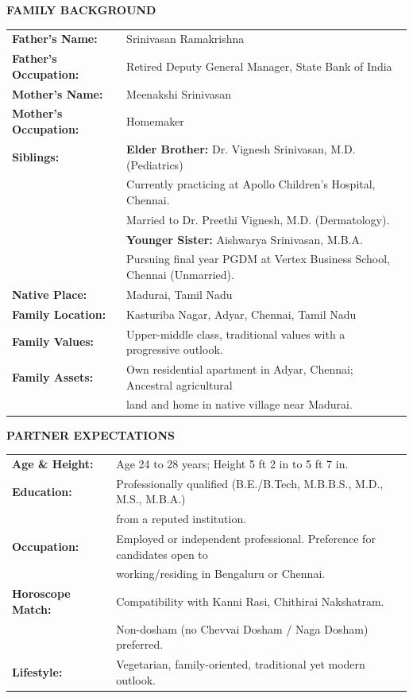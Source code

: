 \documentclass[11pt,a4paper]{article}
\newcommand{\sectionheader}[2]{%
  \vspace{12pt}%
  \noindent%
  \begin{tcolorbox}[%
    colback=AuspiciousRed,%
    colframe=GoldenTurmeric,%
    arc=3pt,%
    boxrule=1.2pt,%
    boxsep=2pt,%
    top=4pt,%
    bottom=4pt,%
    left=8pt,%
    right=8pt%
  ]%
    \centering
    {\color{white}\bfseries\large #1\quad \MakeUppercase{#2}}%
  \end{tcolorbox}%
  \vspace{6pt}%
}
\begin{document}
\sectionheader{\faHome}{Family Background}
\noindent\begin{tabularx}{\textwidth}{>{\bfseries\color{AuspiciousRed}}l X}
  Father's Name: & Srinivasan Ramakrishna \\
  Father's Occupation: & Retired Deputy General Manager, State Bank of India \\
  Mother's Name: & Meenakshi Srinivasan \\
  Mother's Occupation: & Homemaker \\
  Siblings: & \textbf{Elder Brother:} Dr. Vignesh Srinivasan, M.D. (Pediatrics) \\
            & Currently practicing at Apollo Children's Hospital, Chennai. \\
            & Married to Dr. Preethi Vignesh, M.D. (Dermatology). \\[6pt]
            & \textbf{Younger Sister:} Aishwarya Srinivasan, M.B.A. \\
            & Pursuing final year PGDM at Vertex Business School, Chennai (Unmarried). \\[6pt]
  Native Place: & Madurai, Tamil Nadu \\
  Family Location: & Kasturiba Nagar, Adyar, Chennai, Tamil Nadu \\
  Family Values: & Upper-middle class, traditional values with a progressive outlook. \\
  Family Assets: & Own residential apartment in Adyar, Chennai; Ancestral agricultural \\
                 & land and home in native village near Madurai. \\
\end{tabularx}

\sectionheader{\faHeart}{Partner Expectations}
\noindent\begin{tabularx}{\textwidth}{>{\bfseries\color{AuspiciousRed}}l X}
  Age \& Height: & Age 24 to 28 years; Height 5 ft 2 in to 5 ft 7 in. \\
  Education: & Professionally qualified (B.E./B.Tech, M.B.B.S., M.D., M.S., M.B.A.) \\
             & from a reputed institution. \\
  Occupation: & Employed or independent professional. Preference for candidates open to \\
              & working/residing in Bengaluru or Chennai. \\
  Horoscope Match: & Compatibility with Kanni Rasi, Chithirai Nakshatram. \\
                   & Non-dosham (no Chevvai Dosham / Naga Dosham) preferred. \\
  Lifestyle: & Vegetarian, family-oriented, traditional yet modern outlook. \\
\end{tabularx}
\end{document}
